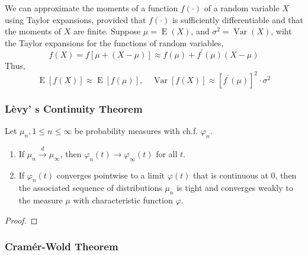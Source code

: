 \begin{remark}
	We can approximate the moments of a function $f(\cdot)$ of a random variable $X$ using Taylor expansions, provided that $f(\cdot)$ is sufficiently differentiable and that the moments of $X$ are finite. Suppose $\mu=\operatorname{E}\left(X\right)$, and $\sigma^{2}=\operatorname{Var}\left(X\right)$, wiht the Taylor expansions for the functions of random variables,
	\begin{equation}
		f\left(X\right)=f\left[\mu+\left(X-\mu\right)\right]\approx f\left(\mu\right)+f^{\prime}\left(\mu\right)\left(X-\mu\right)
	\end{equation}
	Thus,
	\begin{equation}
		\operatorname{E}\left[f\left(X\right)\right]\approx\operatorname{E}\left[f\left(\mu\right)\right],\quad\operatorname{Var}\left[f(X)\right]\approx\left[f^{\prime}\left(\mu\right)\right]^{2}\cdot\sigma^{2}
	\end{equation}
\end{remark}

\subsubsection{L\`evy' s Continuity Theorem}

\begin{theorem}
	Let $\mu_{n},1\leq n\leq\infty$ be probability measures with ch.f. $\varphi_{n}$.
	\begin{enumerate}
		\item If $\mu_{n}\stackrel{d}{\rightarrow}\mu_{\infty}$, then $\varphi_{n}(t)\rightarrow\varphi_{\infty}(t)$ for all $t$.
		\item If $\varphi_{n}(t)$ converges pointwise to a limit $\varphi(t)$ that is continuous at $0$, then the associated sequence of distributions $\mu_{n}$ is tight and converges weakly to the measure $\mu$ with characteristic function $\varphi$.
	\end{enumerate}
\end{theorem}

\begin{proof}

\end{proof}

\subsubsection{Cram\'er-Wold Theorem}

\begin{theorem} \label{thm:cramer-wold-theorem}

\end{theorem}

